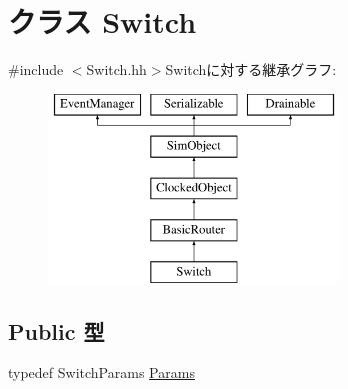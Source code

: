 \hypertarget{classSwitch}{
\section{クラス Switch}
\label{classSwitch}
}


{\ttfamily \#include $<$Switch.hh$>$}Switchに対する継承グラフ:\begin{figure}[H]
\begin{center}
\leavevmode
\includegraphics[height=5cm]{classSwitch}
\end{center}
\end{figure}
\subsection*{Public 型}
\begin{DoxyCompactItemize}
\item 
typedef SwitchParams \hyperlink{classSwitch_a07c03790510d4a31198bb5deef53da38}{Params}
\end{DoxyCompactItemize}
